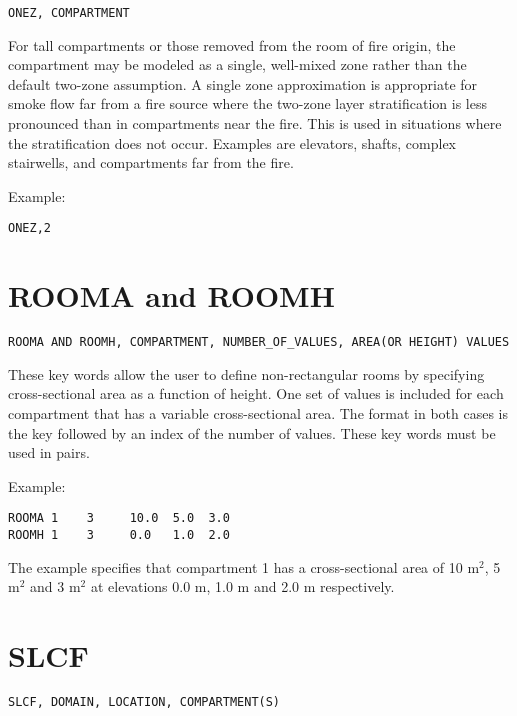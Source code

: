 \begin{lstlisting}
ONEZ, COMPARTMENT
\end{lstlisting}

For tall compartments or those removed from the room of fire origin, the compartment may be modeled as a single, well-mixed zone rather than the default two-zone assumption. A single zone approximation is appropriate for smoke flow far from a fire source where the two-zone layer stratification is less pronounced than in compartments near the fire. This is used in situations where the stratification does not occur. Examples are elevators, shafts, complex stairwells, and compartments far from the fire.

Example:

\begin{lstlisting}
ONEZ,2
\end{lstlisting}

\section{ROOMA and ROOMH}

\begin{lstlisting}
ROOMA AND ROOMH, COMPARTMENT, NUMBER_OF_VALUES, AREA(OR HEIGHT) VALUES
\end{lstlisting}

These key words allow the user to define non-rectangular rooms by specifying cross-sectional area as a function of height. One set of values is included for each compartment that has a variable cross-sectional area. The format in both cases is the key followed by an index of the number of values. These key words must be used in pairs.

Example:

\begin{lstlisting}
ROOMA 1    3     10.0  5.0  3.0
ROOMH 1    3     0.0   1.0  2.0
\end{lstlisting}

The example specifies that compartment 1 has a cross-sectional area of 10 m$^2$, 5 m$^2$ and 3 m$^2$ at elevations 0.0 m, 1.0 m and 2.0 m respectively.

\section{SLCF}

\begin{lstlisting}
SLCF, DOMAIN, LOCATION, COMPARTMENT(S)
\end{lstlisting}

